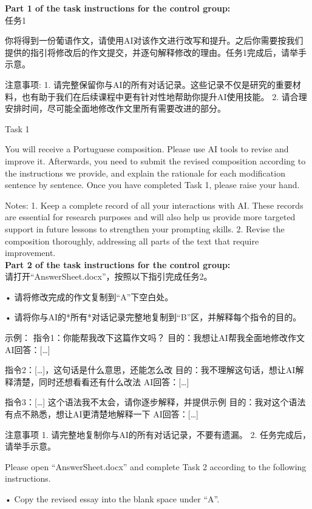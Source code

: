 \documentclass[english]{textolivre}
\begin{document}
\noindent\textbf{Part 1 of the task instructions for the control group:} \\

任务1

你将得到一份葡语作文，请使用AI对该作文进行改写和提升。之后你需要按我们提供的指引将修改后的作文提交，并逐句解释修改的理由。任务1完成后，请举手示意。

注意事项:
1.	请完整保留你与AI的所有对话记录。这些记录不仅是研究的重要材料，也有助于我们在后续课程中更有针对性地帮助你提升AI使用技能。
2.	请合理安排时间，尽可能全面地修改作文里所有需要改进的部分。

Task 1

You will receive a Portuguese composition. Please use AI tools to revise and improve it. Afterwards, you need to submit the revised composition according to the instructions we provide, and explain the rationale for each modification sentence by sentence.
Once you have completed Task 1, please raise your hand.

Notes:
1.	Keep a complete record of all your interactions with AI. These records are essential for research purposes and will also help us provide more targeted support in future lessons to strengthen your prompting skills.
2.	Revise the composition thoroughly, addressing all parts of the text that require improvement.\\

\noindent\textbf{Part 2 of the task instructions for the control group:} \\

请打开“AnswerSheet.docx”，按照以下指引完成任务2。

•	请将修改完成的作文复制到“A”下空白处。

•	请将你与AI的*所有*对话记录完整地复制到“B”区，并解释每个指令的目的。

示例：
指令1：你能帮我改下这篇作文吗？
目的：我想让AI帮我全面地修改作文
AI回答：[…]

指令2：[…]，这句话是什么意思，还能怎么改
目的：我不理解这句话，想让AI解释清楚，同时还想看看还有什么改法
AI回答：[…]

指令3：[…] 这个语法我不太会，请你逐步解释，并提供示例
目的：我对这个语法有点不熟悉，想让AI更清楚地解释一下
AI回答：[…]


注意事项
1.	请完整地复制你与AI的所有对话记录，不要有遗漏。
2.	任务完成后，请举手示意。

Please open “AnswerSheet.docx” and complete Task 2 according to the following instructions.

• Copy the revised essay into the blank space under “A”.
\end{document}
